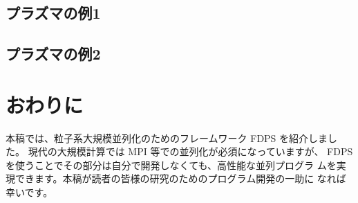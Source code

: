 \documentclass[twocolumn,10pt]{jarticle}
\begin{document}

\subsection{プラズマの例1}
\subsection{プラズマの例2}

\section{おわりに}

本稿では、粒子系大規模並列化のためのフレームワーク FDPS を紹介しました。
現代の大規模計算では MPI 等での並列化が必須になっていますが、
FDPS を使うことでその部分は自分で開発しなくても、高性能な並列プログラ
ムを実現できます。本稿が読者の皆様の研究のためのプログラム開発の一助に
なれば
幸いです。



\acknowledgement{}

\begin{thebibliography}{9}
\end{thebibliography}


\end{document}
